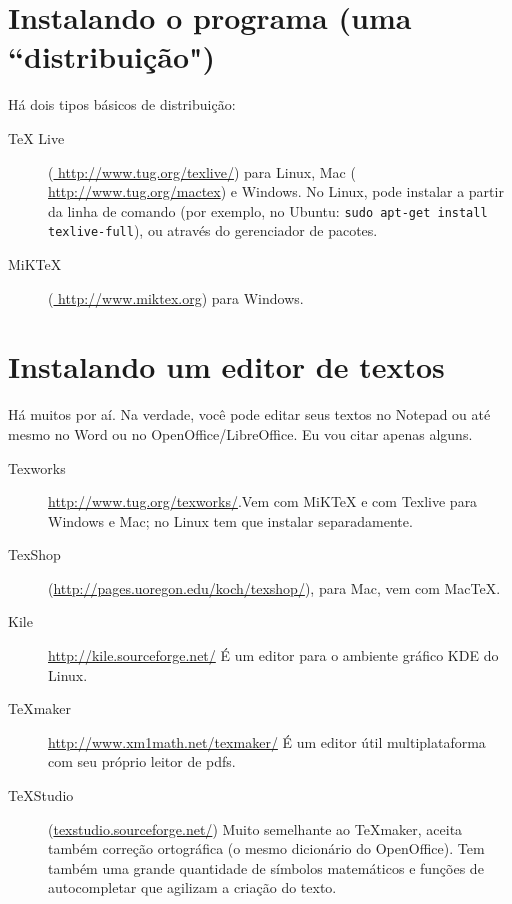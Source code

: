 \documentclass[a4paper,nols,bidi,nohyper]{tufte-book}
\begin{document}
\section{Instalando o programa (uma ``distribuição")}
\label{distribuicoes}
Há dois tipos básicos de distribuição:
\begin{description}
\item [TeX Live] (\url{ http://www.tug.org/texlive/}) para Linux, Mac  (\url{ http://www.tug.org/mactex}) e Windows. No Linux, pode instalar a partir da linha de comando (por exemplo, no Ubuntu: \texttt{sudo apt-get install texlive-full}), ou através do gerenciador de pacotes. 
\item[MiKTeX]  (\url{ http://www.miktex.org}) para Windows.

\end{description}

\section{Instalando um editor de textos}
Há muitos por aí. Na verdade, você pode editar seus textos no Notepad ou até mesmo no Word ou no OpenOffice/LibreOffice.  Eu vou citar apenas alguns.

\begin{description}

\item[Texworks] \url{http://www.tug.org/texworks/}.Vem com MiKTeX e com Texlive para Windows e Mac; no Linux tem que instalar separadamente. 

\item [TexShop] (\url{http://pages.uoregon.edu/koch/texshop/}), para Mac, vem com MacTeX.

\item [Kile] \url{http://kile.sourceforge.net/}
É um editor para o ambiente gráfico KDE do Linux.

\item [TeXmaker] \url{http://www.xm1math.net/texmaker/}
É um editor útil multiplataforma com seu próprio leitor de pdfs.

\item  [TeXStudio] (\url{texstudio.sourceforge.net/})
Muito semelhante ao TeXmaker, aceita também correção ortográfica (o mesmo dicionário do OpenOffice). Tem também uma grande quantidade de símbolos matemáticos e funções de autocompletar que agilizam a criação do texto.

\end{description}
\end{document}
